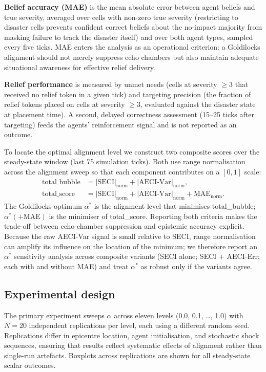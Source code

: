 \documentclass[pdflatex,sn-nature]{sn-jnl}
\begin{document}
\textbf{Belief accuracy (MAE)} is the mean absolute error between agent beliefs and true severity, averaged over cells with non-zero true severity (restricting to disaster cells prevents confident correct beliefs about the no-impact majority from masking failure to track the disaster itself) and over both agent types, sampled every five ticks. MAE enters the analysis as an operational criterion: a Goldilocks alignment should not merely suppress echo chambers but also maintain adequate situational awareness for effective relief delivery.

\textbf{Relief performance} is measured by unmet needs (cells at severity $\geq 3$ that received no relief token in a given tick) and targeting precision (the fraction of relief tokens placed on cells at severity $\geq 3$, evaluated against the disaster state at placement time). A second, delayed correctness assessment (15--25 ticks after targeting) feeds the agents' reinforcement signal and is not reported as an outcome.

To locate the optimal alignment level we construct two composite scores over the steady-state window (last 75 simulation ticks). Both use range normalisation across the alignment sweep so that each component contributes on a $[0, 1]$ scale:
\begin{align}
\text{total\_bubble} &= |\text{SECI}|_{\text{norm}} + |\text{AECI-Var}|_{\text{norm}}, \label{eq:bubble}\\
\text{total\_score} &= |\text{SECI}|_{\text{norm}} + |\text{AECI-Var}|_{\text{norm}} + \text{MAE}_{\text{norm}}. \label{eq:score}
\end{align}
The Goldilocks optimum $\alpha^{*}$ is the alignment level that minimises total\_bubble; $\alpha^{*}(+\text{MAE})$ is the minimiser of total\_score. Reporting both criteria makes the trade-off between echo-chamber suppression and epistemic accuracy explicit. Because the raw AECI-Var signal is small relative to SECI, range normalisation can amplify its influence on the location of the minimum; we therefore report an $\alpha^{*}$ sensitivity analysis across composite variants (SECI alone; SECI + AECI-Err; each with and without MAE) and treat $\alpha^{*}$ as robust only if the variants agree.

\subsection{Experimental design}\label{sec:design}

The primary experiment sweeps $\alpha$ across eleven levels (0.0, 0.1, \ldots, 1.0) with $N = 20$ independent replications per level, each using a different random seed. Replications differ in epicentre location, agent initialisation, and stochastic shock sequences, ensuring that results reflect systematic effects of alignment rather than single-run artefacts. Boxplots across replications are shown for all steady-state scalar outcomes.
\end{document}
